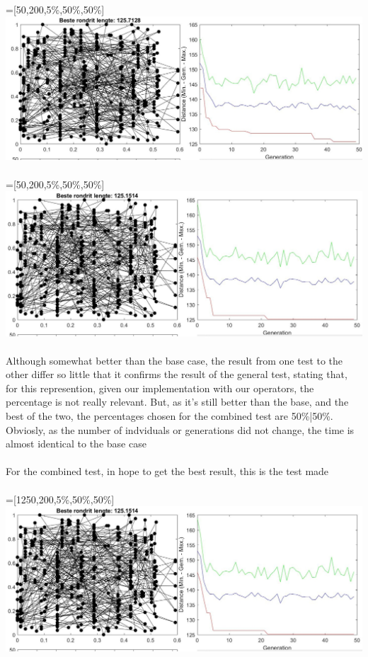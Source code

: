 \\
 =[50,200,5\%,50\%,50\%]\\
\includegraphics[width=\textwidth]{img/specific/order_crossover/general_6.jpg}\\
\\
 =[50,200,5\%,50\%,50\%]\\
\includegraphics[width=\textwidth]{img/specific/order_crossover/general_7.jpg}\\
\\
Although somewhat better than the base case, the result from one test to the
other differ so little that it confirms the result of the general test, stating
that, for this represention, given our implementation with our
operators, the percentage is not really relevant. But, as it's still better
than the base, and the best of the two, the percentages chosen for the combined
test are 50\%|50\%. Obviosly, as the number of indviduals or
generations did not change, the time is almost identical to the base case\\
\\
For the combined test, in hope to get the best result, this is the test made\\
\\
 =[1250,200,5\%,50\%,50\%]\\
\includegraphics[width=\textwidth]{img/specific/order_crossover/general_7.jpg}\\
